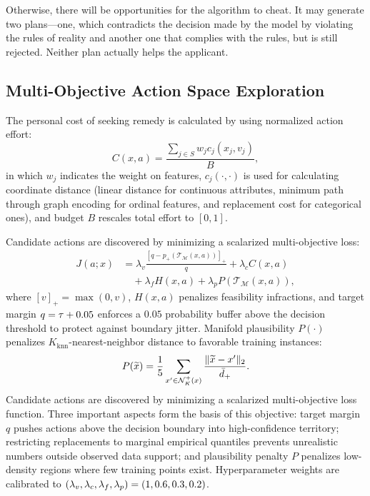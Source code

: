 \documentclass[nolineno]{paper/ieee-access/ieeeaccess}%
\newcommand{\SCM}{\ensuremath{\mathcal{M}}}
\newcommand{\Replay}{\ensuremath{\mathcal{T}_{\SCM}}}
\begin{document}
Otherwise, there will be opportunities for the algorithm to cheat. It may generate two plans---one, which contradicts the decision made by the model by violating the rules of reality and another one that complies with the rules, but is still rejected. Neither plan actually helps the applicant.

\subsection{Multi-Objective Action Space Exploration}
The personal cost of seeking remedy is calculated by using normalized action effort:
\begin{equation}
  C(x, a) = \frac{\sum_{j \in S} w_j c_j(x_j, v_j)}{B},
  \label{eq:cost}
\end{equation}
in which $w_j$ indicates the weight on features, $c_j(\cdot, \cdot)$ is used for calculating coordinate distance (linear distance for continuous attributes, minimum path through graph encoding for ordinal features, and replacement cost for categorical ones), and budget $B$ rescales total effort to $[0, 1]$.

Candidate actions are discovered by minimizing a scalarized multi-objective loss:
\begin{align}
  J(a; x) &= \lambda_v \frac{[q - p_+(\Replay(x, a))]_+}{q} + \lambda_c C(x, a) \nonumber \\
          &\quad + \lambda_f H(x, a) + \lambda_p P(\Replay(x, a)),
  \label{eq:objective}
\end{align}
where $[v]_+ = \max(0, v)$, $H(x, a)$ penalizes feasibility infractions, and target margin $q = \tau + 0.05$ enforces a $0.05$ probability buffer above the decision threshold to protect against boundary jitter. Manifold plausibility $P(\cdot)$ penalizes $K_{\mathrm{knn}}$-nearest-neighbor distance to favorable training instances:
\begin{equation}
  P(\widetilde{x}) = \frac{1}{5} \sum_{x' \in \mathcal{N}_K^+(x)} \frac{\|\widetilde{x} - x'\|_2}{\bar{d}_+}.
  \label{eq:plausibility}
\end{equation}
Candidate actions are discovered by minimizing a scalarized multi-objective loss function. Three important aspects form the basis of this objective: target margin $q$ pushes actions above the decision boundary into high-confidence territory; restricting replacements to \GridPoints{} marginal empirical quantiles prevents unrealistic numbers outside observed data support; and plausibility penalty $P$ penalizes low-density regions where few training points exist. Hyperparameter weights are calibrated to $(\lambda_v, \lambda_c, \lambda_f, \lambda_p) = (1, 0.6, 0.3, 0.2)$.
\end{document}
